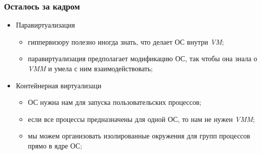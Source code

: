 \begin{frame}
\frametitle{Осталось за кадром}
\begin{itemize}
  \item<1-> Паравиртуализация
    \begin{itemize}
      \item гиппервизору полезно иногда знать, что делает ОС внутри \emph{VM};
      \item паравиртуализация предполагает модификацию ОС, так чтобы она знала о
            \emph{VMM} и умела с ним взаимодействовать;
    \end{itemize}
  \item<2-> Контейнерная виртуализаци
    \begin{itemize}
      \item ОС нужна нам для запуска пользовательских процессов;
      \item если все процессы предназначены для одной ОС, то нам не нужен
            \emph{VMM};
      \item мы можем организовать изолированные окружения для групп процессов
            прямо в ядре ОС;
    \end{itemize}
\end{itemize}
\end{frame}
